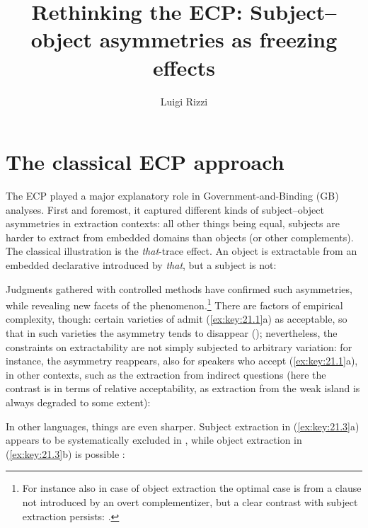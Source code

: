 \documentclass[output=paper]{langsci/langscibook}
\author{Luigi Rizzi}
\title{Rethinking the ECP: Subject--object asymmetries as freezing effects}
\begin{document}
\glsresetall

\section{The classical ECP approach}

The \gls{ECP} played a major explanatory role in
Govern\-ment-and-Binding (\gls{GB}) analyses.  First and foremost,
it captured different kinds of subject--object asymmetries in extraction
contexts: all other things being equal, subjects are harder to extract from
embedded domains than objects (or other complements).  The classical
illustration is the \emph{that}-trace effect. An object is extractable from an
embedded declarative introduced by \emph{that}, but a subject is not:

\ea%
    \label{ex:key:21.1}
    \z
\z
%
Judgments gathered with controlled methods have confirmed such asymmetries,
while revealing new facets of the phenomenon.\footnote{For instance also in
    case of object extraction the optimal case is from a clause not introduced
    by an overt complementizer, but a clear contrast with
    subject extraction persists: \citet{Schippers2012}.} There are factors of
    empirical complexity, though: certain varieties of  admit
    (\ref{ex:key:21.1}a) as acceptable, so that in such varieties the asymmetry
    tends to disappear (\citealt{Sobin2002,Schippers2012}); nevertheless, the
    constraints on extractability are not simply subjected to arbitrary
    variation: for instance, the asymmetry reappears, also for speakers who
    accept (\ref{ex:key:21.1}a), in other contexts, such as the extraction from
    indirect questions (here the contrast is in terms of relative
    acceptability, as extraction from the weak island is always
    degraded to some extent):

\ea%
    \label{ex:key:21.2}
    \z
\z
%
In other languages, things are even sharper. Subject extraction in
(\ref{ex:key:21.3}a) appears to be systematically excluded in ,
while object extraction in (\ref{ex:key:21.3}b) is possible
\citep{Berthelot2017}:
\end{document}
